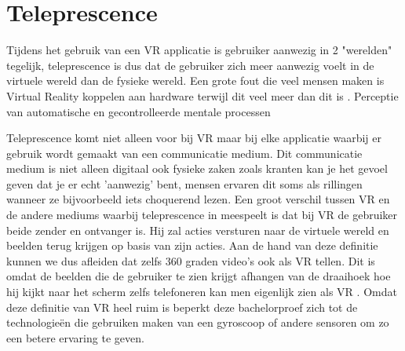 \section{Teleprescence}
Tijdens het gebruik van een VR applicatie is gebruiker aanwezig in 2 "werelden" tegelijk, teleprescence is dus dat de gebruiker zich meer aanwezig voelt in de virtuele wereld dan de fysieke wereld.
Een grote fout die veel mensen maken is Virtual Reality koppelen aan hardware terwijl dit veel meer dan dit is \autocite{Steuer1992}.
Perceptie van automatische en gecontrolleerde mentale processen

Teleprescence komt niet alleen voor bij VR maar bij elke applicatie waarbij er gebruik wordt gemaakt van een communicatie medium. Dit communicatie medium is niet alleen digitaal ook fysieke zaken zoals kranten kan je het gevoel geven dat je er echt 'aanwezig' bent, mensen ervaren dit soms als rillingen wanneer ze bijvoorbeeld iets choquerend lezen. 
Een groot verschil tussen VR en de andere mediums waarbij teleprescence in meespeelt is dat bij VR de gebruiker beide zender en ontvanger is. Hij zal acties versturen naar de virtuele wereld en beelden terug krijgen op basis van zijn acties.
Aan de hand van deze definitie kunnen we dus afleiden dat zelfs 360 graden video's ook als VR tellen. Dit is omdat de beelden die de gebruiker te zien krijgt afhangen van de draaihoek hoe hij kijkt naar het scherm zelfs telefoneren kan men eigenlijk zien als VR \autocite{Steuer1992}.
Omdat deze definitie van VR heel ruim is beperkt deze bachelorproef zich tot de technologieën die gebruiken maken van een gyroscoop of andere sensoren om zo een betere ervaring te geven.


